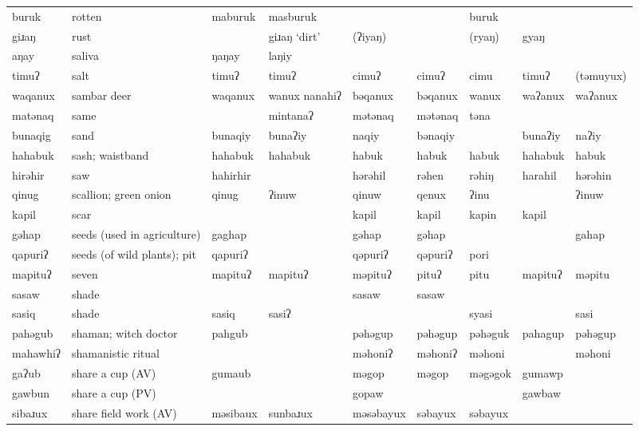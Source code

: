 \begin{landscape}
\begin{longtable}{*{9}{>{\raggedright\arraybackslash}p{}}}
\text{*}buruk       & rotten & maburuk & masburuk &  &  & buruk &  & \\
\text{*}giɹaŋ        & rust &  & giɹaŋ `dirt' & (ʔiyaŋ) &  & (ryaŋ) & gyaŋ & \\
\text{*}aŋay        & saliva & ŋaŋay & laŋiy &  &  &  &  & \\
\text{*}timuʔ        & salt & timuʔ & timuʔ & cimuʔ & cimuʔ & cimu & timuʔ & (təmuyux)\\
\text{*}waqanux      & sambar deer & waqanux & wanux nanahiʔ & bəqanux & bəqanux & wanux & waʔanux & waʔanux\\
\text{*}matənaq      & same &  & mintanaʔ & mətənaq & mətənaq & təna &  & \\
\text{*}bunaqig      & sand & bunaqiy & bunaʔiy & naqiy & bənaqiy &  & bunaʔiy & naʔiy\\
\text{*}hahabuk      & sash; waistband & hahabuk & hahabuk & habuk & habuk & habuk & hahabuk & habuk\\
\text{*}hirəhir      & saw & hahirhir &  & hərəhil & rəhen & rəhiŋ & harahil & hərəhin\\
\text{*}qinug        & scallion; green onion & qinug & ʔinuw & qinuw & qenux & ʔinu &  & ʔinuw\\
\text{*}kapil        & scar &  &  & kapil & kapil & kapin & kapil & \\
\text{*}gəhap        & seeds (used in agriculture) & gaghap &  & gəhap & gəhap &  &  & gahap\\
\text{*}qapuriʔ      & seeds (of wild plants); pit & qapuriʔ &  & qəpuriʔ & qəpuriʔ & pori &  & \\
\text{*}mapituʔ      & seven & mapituʔ & mapituʔ & məpituʔ & pituʔ & pitu & mapituʔ & məpitu\\
\text{*}sasaw        & shade &  &  & sasaw & sasaw &  &  & \\
\text{*}sasiq        & shade & sasiq & sasiʔ &  &  & syasi &  & sasi\\
\text{*}pahəgub      & shaman; witch doctor & pahgub &  & pəhəgup & pəhəgup & pəhəguk & pahagup & pəhəgup\\
\text{*}mahawhiʔ     & shamanistic ritual &  &  & məhoniʔ & məhoniʔ & məhoni &  & məhoni\\
\text{*}gaʔub       & share a cup (AV) & gumaub &  & məgop & məgop & məgəgok & gumawp & \\
\text{*}gawbun       & share a cup (PV) &  &  & gopaw &  &  & gawbaw & \\
\text{*}sibaɹux     & share field work (AV) & məsibaux & sunbaɹux & məsəbayux & səbayux & səbayux &  & \\

\end{longtable}
\end{landscape}
